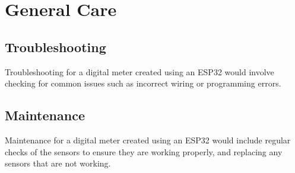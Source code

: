 %
%
%
%

\chapter{General Care}

\section{Troubleshooting}

Troubleshooting for a digital meter created using an ESP32 would involve checking for common issues such as incorrect wiring or programming errors.\\

\section{Maintenance}

Maintenance for a digital meter created using an ESP32 would include regular checks of the sensors to ensure they are working properly, and replacing any sensors that are not working.




